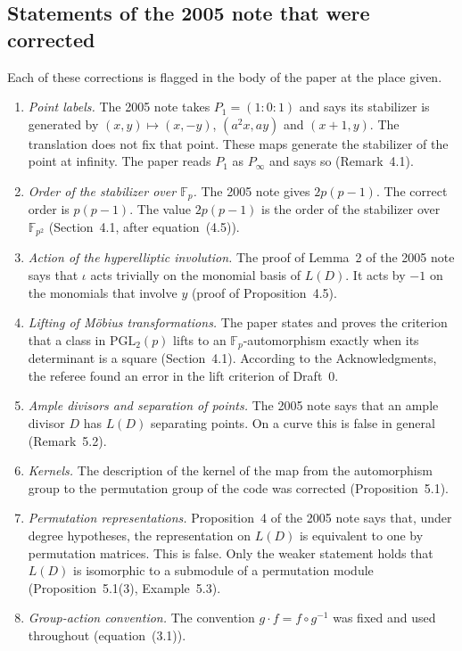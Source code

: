 \documentclass[12pt,letterpaper]{article}
\newcommand{\F}{\mathbb{F}}
\begin{document}
\subsection{Statements of the 2005 note that were corrected}\label{sec:errors}
Each of these corrections is flagged in the body of the paper at the place given.
\begin{enumerate}
\item \emph{Point labels.} The 2005 note takes $P_1=(1:0:1)$ and says its
stabilizer is generated by $(x,y)\mapsto(x,-y)$, $(a^2x,ay)$ and $(x+1,y)$. The
translation does not fix that point. These maps generate the stabilizer of the
point at infinity. The paper reads $P_1$ as $P_\infty$ and says so (Remark~4.1).
\item \emph{Order of the stabilizer over $\F_p$.} The 2005 note gives $2p(p-1)$.
The correct order is $p(p-1)$. The value $2p(p-1)$ is the order of the stabilizer
over $\F_{p^2}$ (Section~4.1, after equation~(4.5)).
\item \emph{Action of the hyperelliptic involution.} The proof of Lemma~2 of the
2005 note says that $\iota$ acts trivially on the monomial basis of $L(D)$. It
acts by $-1$ on the monomials that involve $y$ (proof of Proposition~4.5).
\item \emph{Lifting of M\"obius transformations.} The paper states and proves the
criterion that a class in $\mathrm{PGL}_2(p)$ lifts to an $\F_p$-automorphism
exactly when its determinant is a square (Section~4.1). According to the
Acknowledgments, the referee found an error in the lift criterion of Draft~0.
\item \emph{Ample divisors and separation of points.} The 2005 note says that an
ample divisor $D$ has $L(D)$ separating points. On a curve this is false in
general (Remark~5.2).
\item \emph{Kernels.} The description of the kernel of the map from the
automorphism group to the permutation group of the code was corrected
(Proposition~5.1).
\item \emph{Permutation representations.} Proposition~4 of the 2005 note says
that, under degree hypotheses, the representation on $L(D)$ is equivalent to one
by permutation matrices. This is false. Only the weaker statement holds that
$L(D)$ is isomorphic to a submodule of a permutation module
(Proposition~5.1(3), Example~5.3).
\item \emph{Group-action convention.} The convention $g\cdot f=f\circ g^{-1}$ was
fixed and used throughout (equation~(3.1)).
\end{enumerate}
\end{document}

